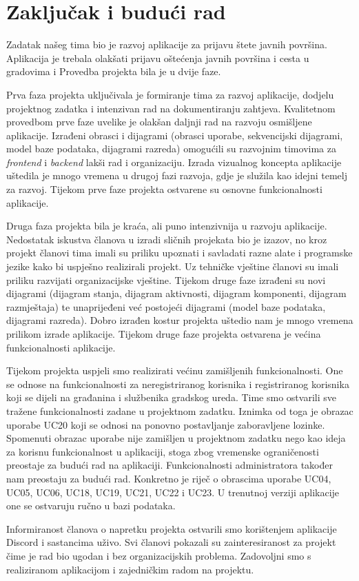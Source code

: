 \chapter{Zaključak i budući rad}
		
		Zadatak našeg tima bio je razvoj aplikacije za prijavu štete javnih površina. Aplikacija je trebala olakšati 
		prijavu oštećenja javnih površina i cesta u gradovima i Provedba projekta bila je u dvije faze.

		Prva faza projekta uključivala je formiranje tima za razvoj aplikacije, dodjelu projektnog zadatka i intenzivan
		rad na dokumentiranju zahtjeva. Kvalitetnom provedbom prve faze uvelike je olakšan daljnji rad na razvoju 
		osmišljene aplikacije. Izrađeni obrasci i dijagrami (obrasci uporabe, sekvencijski dijagrami, model baze podataka,
		dijagrami razreda) omogućili su razvojnim timovima za \textit{frontend} i \textit{backend} lakši rad i organizaciju.
		Izrada vizualnog koncepta aplikacije uštedila je mnogo vremena u drugoj fazi razvoja, gdje je služila kao idejni 
		temelj za razvoj. Tijekom prve faze projekta ostvarene su osnovne funkcionalnosti aplikacije.

		Druga faza projekta bila je kraća, ali puno intenzivnija u razvoju aplikacije. Nedostatak iskustva članova u izradi
		sličnih projekata bio je izazov, no kroz projekt članovi tima imali su priliku upoznati i savladati razne alate i 
		programske jezike kako bi uspješno realizirali projekt. Uz tehničke vještine članovi su imali priliku razvijati 
		organizacijske vještine. Tijekom druge faze izrađeni su novi dijagrami (dijagram stanja, dijagram aktivnosti, dijagram
		komponenti, dijagram razmještaja) te unaprijeđeni već postojeći dijagrami (model baze podataka, dijagrami razreda).
		Dobro izrađen kostur projekta uštedio nam je mnogo vremena prilikom izrade aplikacije. Tijekom druge faze projekta ostvarena 
		je većina funkcionalnosti aplikacije.

		Tijekom projekta uspjeli smo realizirati većinu zamišljenih funkcionalnosti. One se odnose na funkcionalnosti za 
		neregistriranog korisnika i registriranog korisnika koji se dijeli na građanina i službenika gradskog ureda. Time 
		smo ostvarili sve tražene funkcionalnosti zadane u projektnom zadatku. Iznimka od toga je obrazac uporabe UC20 koji se 
		odnosi na ponovno postavljanje zaboravljene lozinke. Spomenuti obrazac uporabe nije zamišljen u projektnom zadatku nego
		kao ideja za korisnu funkcionalnost u aplikaciji, stoga zbog vremenske ograničenosti preostaje za budući rad na aplikaciji.
		Funkcionalnosti administratora također nam preostaju za budući rad. Konkretno je riječ o obrascima uporabe UC04, UC05,
		UC06, UC18, UC19, UC21, UC22 i UC23. U trenutnoj verziji aplikacije one se ostvaruju ručno u bazi podataka. 

		Informiranost članova o napretku projekta ostvarili smo korištenjem aplikacije Discord i sastancima uživo. Svi 
		članovi pokazali su zainteresiranost za projekt čime je rad bio ugodan i bez organizacijskih problema. Zadovoljni smo s
		realiziranom aplikacijom i zajedničkim radom na projektu.

		\eject 